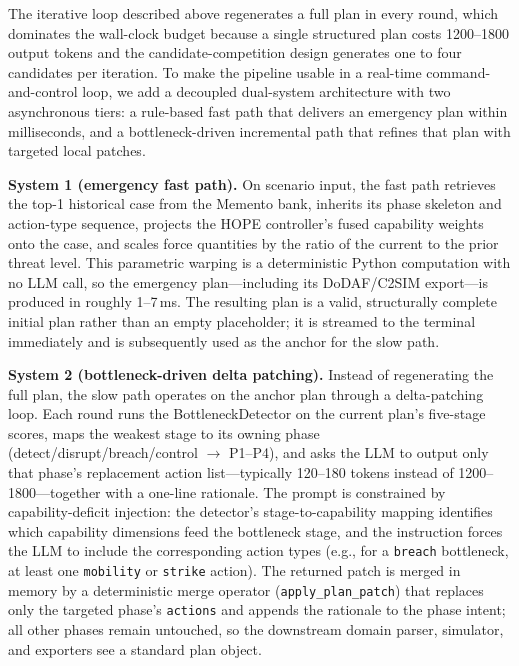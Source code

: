The iterative loop described above regenerates a full plan in every round, which dominates the wall-clock budget because a single structured plan costs 1200--1800 output tokens and the candidate-competition design generates one to four candidates per iteration. To make the pipeline usable in a real-time command-and-control loop, we add a decoupled dual-system architecture with two asynchronous tiers: a rule-based fast path that delivers an emergency plan within milliseconds, and a bottleneck-driven incremental path that refines that plan with targeted local patches.

\textbf{System 1 (emergency fast path).} On scenario input, the fast path retrieves the top-1 historical case from the Memento bank, inherits its phase skeleton and action-type sequence, projects the HOPE controller's fused capability weights onto the case, and scales force quantities by the ratio of the current to the prior threat level. This parametric warping is a deterministic Python computation with no LLM call, so the emergency plan---including its DoDAF/C2SIM export---is produced in roughly 1--7\,ms. The resulting plan is a valid, structurally complete initial plan rather than an empty placeholder; it is streamed to the terminal immediately and is subsequently used as the anchor for the slow path.

\textbf{System 2 (bottleneck-driven delta patching).} Instead of regenerating the full plan, the slow path operates on the anchor plan through a delta-patching loop. Each round runs the BottleneckDetector on the current plan's five-stage scores, maps the weakest stage to its owning phase (detect/disrupt/breach/control $\rightarrow$ P1--P4), and asks the LLM to output only that phase's replacement action list---typically 120--180 tokens instead of 1200--1800---together with a one-line rationale. The prompt is constrained by capability-deficit injection: the detector's stage-to-capability mapping identifies which capability dimensions feed the bottleneck stage, and the instruction forces the LLM to include the corresponding action types (e.g., for a \texttt{breach} bottleneck, at least one \texttt{mobility} or \texttt{strike} action). The returned patch is merged in memory by a deterministic merge operator (\texttt{apply\_plan\_patch}) that replaces only the targeted phase's \texttt{actions} and appends the rationale to the phase intent; all other phases remain untouched, so the downstream domain parser, simulator, and exporters see a standard plan object.


